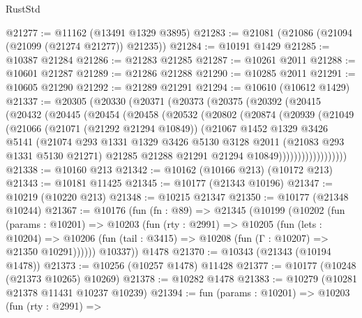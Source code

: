 \begin{lexlean}{RustStd}
\begin{coremodule}
@21277 := @11162 (@13491 @1329 @3895)
@21283 := @21081 (@21086 (@21094 (@21099 (@21274 @21277)) @21235))
@21284 := @10191 @1429
@21285 := @10387 @21284
@21286 := @21283 @21285
@21287 := @10261 @2011
@21288 := @10601 @21287
@21289 := @21286 @21288
@21290 := @10285 @2011
@21291 := @10605 @21290
@21292 := @21289 @21291
@21294 := @10610 (@10612 @1429)
@21337 := @20305
    (@20330
      (@20371
        (@20373
          (@20375
            (@20392
              (@20415
                (@20432
                  (@20445
                    (@20454
                      (@20458
                        (@20532
                          (@20802
                            (@20874
                              (@20939
                                (@21049
                                  (@21066
                                    (@21071 (@21292 @21294 @10849))
                                    (@21067
                                      @1452
                                      @1329
                                      @3426
                                      @5141
                                      (@21074
                                        @293
                                        @1331
                                        @1329
                                        @3426
                                        @5130
                                        @3128
                                        @2011
                                        (@21083 @293 @1331 @5130 @21271)
                                        @21285
                                        @21288
                                        @21291
                                        @21294
                                        @10849))))))))))))))))))
@21338 := @10160 @213
@21342 := @10162 (@10166 @213) (@10172 @213)
@21343 := @10181 @11425
@21345 := @10177 (@21343 @10196)
@21347 := @10219 (@10220 @213)
@21348 := @10215 @21347
@21350 := @10177 (@21348 @10244)
@21367 := @10176
    (fun (fn : @89) =>
    @21345
      (@10199
        (@10202
          (fun (params : @10201) =>
          @10203
            (fun (rty : @2991) =>
            @10205
              (fun (lets : @10204) =>
              @10206 (fun (tail : @3415) => @10208 (fun (Γ : @10207) => @21350 @10291))))))
        @10337))
    @1478
@21370 := @10343 (@21343 (@10194 @1478))
@21373 := @10256 (@10257 @1478) @11428
@21377 := @10177 (@10248 (@21373 @10265) @10269)
@21378 := @10282 @1478
@21383 := @10279 (@10281 @21378 @11431 @10237 @10239)
@21394 := fun (params : @10201) =>
  @10203
    (fun (rty : @2991) =>

\end{coremodule}
\end{lexlean}

